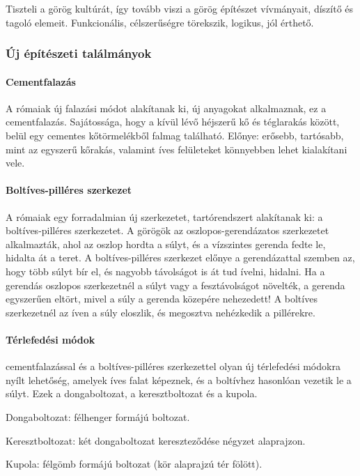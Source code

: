 Tiszteli a görög kultúrát, így tovább viszi a görög építészet vívmányait, díszítő és tagoló elemeit. Funkcionális, célszerűségre törekszik, logikus, jól érthető.


\subsubsection{Új építészeti találmányok}

\paragraph{Cementfalazás}
A rómaiak új falazási módot alakítanak ki, új anyagokat alkalmaznak, ez a cementfalazás. Sajátossága, hogy a kívül lévő héjszerű kő és téglarakás között, belül egy cementes kőtörmelékből falmag található. Előnye: erősebb, tartósabb, mint az egyszerű kőrakás, valamint íves felületeket könnyebben lehet kialakítani vele.

\paragraph{Boltíves-pilléres szerkezet}
A rómaiak egy forradalmian új szerkezetet, tartórendszert alakítanak ki: a boltíves-pilléres szerkezetet. A görögök az oszlopos-gerendázatos szerkezetet alkalmazták, ahol az oszlop hordta a súlyt, és a vízszintes gerenda fedte le, hidalta át a teret. A boltíves-pilléres szerkezet előnye a gerendázattal szemben az, hogy több súlyt bír el, és nagyobb távolságot is át tud ívelni, hidalni. Ha a gerendás oszlopos szerkezetnél a súlyt vagy a fesztávolságot növelték, a gerenda egyszerűen eltört, mivel a súly a gerenda közepére nehezedett! A boltíves szerkezetnél az íven a súly eloszlik, és megosztva nehézkedik a pillérekre.

\paragraph{Térlefedési módok}
cementfalazással és a boltíves-pilléres szerkezettel olyan új térlefedési módokra nyílt lehetőség, amelyek íves falat képeznek, és a boltívhez hasonlóan vezetik le a súlyt. Ezek a dongaboltozat, a keresztboltozat és a kupola.
\begin{compactitem}
	\item Dongaboltozat: félhenger formájú boltozat.
	\item Keresztboltozat: két dongaboltozat kereszteződése négyzet alaprajzon.
	\item Kupola: félgömb formájú boltozat (kör alaprajzú tér fölött).
\end{compactitem}


